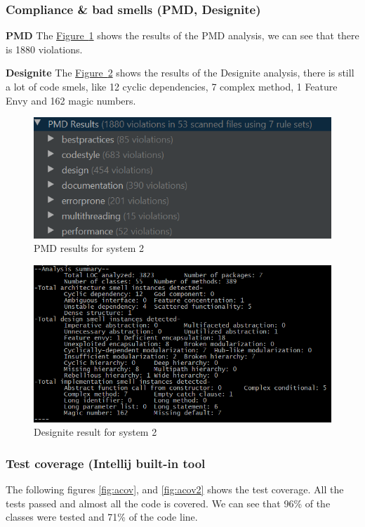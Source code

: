 \documentclass[]{article}
\newcommand{\wordlink}[2]{\hyperref[#2]{#1~\ref{#2}}}
\begin{document}
\subsubsection{Compliance & bad smells (PMD, Designite)} 

\textbf{PMD} The \wordlink{Figure}{fig:pmd} shows the results of the PMD analysis, we can see that there is 1880 violations.

\textbf{Designite} The \wordlink{Figure}{fig:designite} shows the results of the Designite analysis, there is still a lot of code smels, like 12 cyclic dependencies, 7 complex method, 1 Feature Envy and 162 magic numbers.

\begin{figure}[h!]
\centering
\includegraphics[width=0.75\linewidth]{pmdFinal.png}
\caption{PMD results for system 2}
\label{fig:pmd}
\end{figure}

\begin{figure}[h!]
\centering
\includegraphics[width=0.75\linewidth]{designiteFinal.png}
\caption{Designite result for system 2}
\label{fig:designite}
\end{figure}

\subsubsection{Test coverage (Intellij built-in tool}

The following figures \ref{fig:acov},  and \ref{fig:acov2} shows the test coverage. All the tests passed and almost all the code is covered. We can see that 96\% of the classes were tested and 71\% of the code line. 
\end{document}
